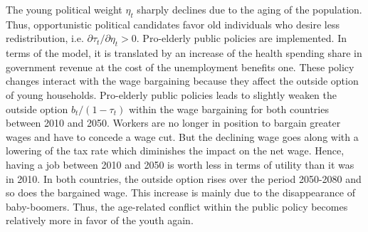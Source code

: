 The young political weight $\eta_t$ sharply declines due to the aging of the population. Thus, opportunistic political candidates favor old individuals who desire less redistribution, i.e. $\partial\tau_t / \partial \eta_t > 0$. Pro-elderly public policies are implemented. In terms of the model, it is translated by an increase of the health spending share in government revenue at the cost of the unemployment benefits one.
These policy changes interact with the wage bargaining because they affect the outside option of young households. 
Pro-elderly public policies leads to slightly weaken the outside option $b_t/(1-\tau_t)$ within the wage bargaining for both countries between 2010 and 2050. Workers are no longer in position to bargain greater wages and have to concede a wage cut. But the declining wage goes along with a lowering of the tax rate which diminishes the impact on the net wage. Hence, having a job between 2010 and 2050 is worth less in terms of utility than it was in 2010. In both countries, the outside option rises over the period 2050-2080 and so does the bargained wage. This increase is mainly due to the disappearance of baby-boomers. Thus, the age-related conflict within the public policy becomes relatively more in favor of the youth again.

